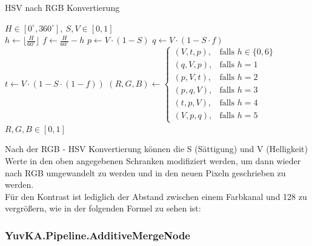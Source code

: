 \begin{itemize}
	\begin{algorithm}
	\caption{HSV nach RGB Konvertierung}
		\begin{algorithmic}[1]
			\REQUIRE $ H \in [0^{\circ}, 360^{\circ}],\ S, V \in [0, 1] $ \\
			\STATE $ h \gets \lfloor\frac{H}{60^\circ}\rfloor $
			\STATE $ f \gets \frac{H}{60^{\circ}} - h $
			\STATE $ p \gets V \cdot (1 - S) $ 
			\STATE $ q \gets V \cdot (1 - S \cdot f) $
			\STATE $ t \gets V \cdot (1 - S \cdot (1 - f)) $
			\vspace{5px}
			\STATE $
						(R, G, B) \gets
						\begin{cases}
							(V, t, p), & \text{falls } h \in \{0, 6\} \\
							(q, V, p), & \text{falls } h = 1 \\
							(p, V, t), & \text{falls } h = 2 \\
							(p, q, V), & \text{falls } h = 3 \\
							(t, p, V), & \text{falls } h = 4 \\
							(V, p, q), & \text{falls } h = 5
						\end{cases}
					$
			\vspace{5px}
			\ENSURE $ R, G, B \in [0, 1] $ \\
		\end{algorithmic}
	\end{algorithm} 

	Nach der RGB - HSV Konvertierung können die S (Sättigung) und V (Helligkeit) Werte in den oben angegebenen Schranken modifiziert werden, um dann wieder nach RGB umgewandelt zu werden und in den neuen Pixeln geschrieben zu werden. \\
	Für den Kontrast ist lediglich der Abstand zwischen einem Farbkanal und 128 zu vergrößern, wie in der folgenden Formel zu sehen ist: %

\end{itemize}

\subsubsection{YuvKA.Pipeline.AdditiveMergeNode}

